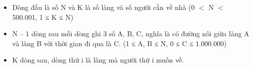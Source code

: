 \begin{itemize}
	\item     Dòng đầu là số N và K là số làng và số người cần về nhà (0 $<$ N $<$ 500.001, 1 ≤ K ≤ N)   
	\item     N – 1 dòng sau mỗi dòng ghi 3 số A, B, C, nghĩa là có đường nối giữa làng A và làng B với thời gian đi qua là C. (1 ≤ A, B ≤ N, 0 ≤ C ≤ 1.000.000)   
	\item     K dòng sau, dòng thứ i là làng mà người thứ i muốn về.   
\end{itemize}

\